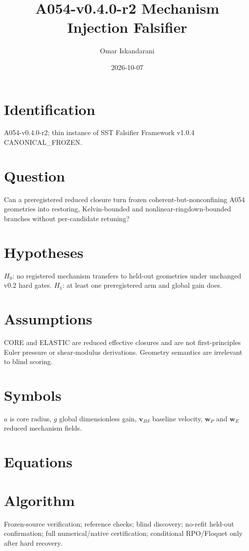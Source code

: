 \documentclass[11pt]{article}
\title{A054-v0.4.0-r2 Mechanism Injection Falsifier}\author{Omar Iskandarani}\date{2026-10-07}
\begin{document}
\maketitle
\section{Identification} A054-v0.4.0-r2; thin instance of SST Falsifier Framework v1.0.4 CANONICAL\_FROZEN.
\section{Question} Can a preregistered reduced closure turn frozen coherent-but-nonconfining A054 geometries into restoring, Kelvin-bounded and nonlinear-ringdown-bounded branches without per-candidate retuning?
\section{Hypotheses} $H_0$: no registered mechanism transfers to held-out geometries under unchanged v0.2 hard gates. $H_1$: at least one preregistered arm and global gain does.
\section{Assumptions} CORE and ELASTIC are reduced effective closures and are not first-principles Euler pressure or shear-modulus derivations. Geometry semantics are irrelevant to blind scoring.
\section{Symbols} $a$ is core radius, $g$ global dimensionless gain, $\mathbf v_{BS}$ baseline velocity, $\mathbf w_P$ and $\mathbf w_E$ reduced mechanism fields.
\section{Equations}
\section{Algorithm} Frozen-source verification; reference checks; blind discovery; no-refit held-out confirmation; full numerical/native certification; conditional RPO/Floquet only after hard recovery.
\end{document}
